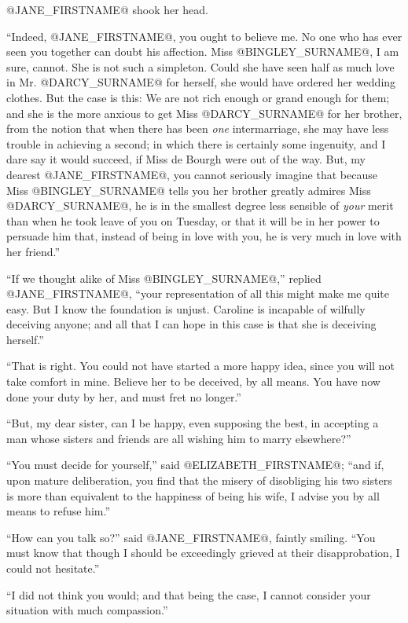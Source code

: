 @JANE_FIRSTNAME@ shook her head.

``Indeed, @JANE_FIRSTNAME@, you ought to believe me. No one who has ever seen you
together can doubt his affection. Miss @BINGLEY_SURNAME@, I am sure, cannot. She
is not such a simpleton. Could she have seen half as much love in Mr.
@DARCY_SURNAME@ for herself, she would have ordered her wedding clothes. But the
case is this: We are not rich enough or grand enough for them; and she
is the more anxious to get Miss @DARCY_SURNAME@ for her brother, from the notion
that when there has been \textit{one} intermarriage, she may have less trouble
in achieving a second; in which there is certainly some ingenuity, and
I dare say it would succeed, if Miss de Bourgh were out of the way. But,
my dearest @JANE_FIRSTNAME@, you cannot seriously imagine that because Miss @BINGLEY_SURNAME@
tells you her brother greatly admires Miss @DARCY_SURNAME@, he is in the smallest
degree less sensible of \textit{your} merit than when he took leave of you on
Tuesday, or that it will be in her power to persuade him that, instead
of being in love with you, he is very much in love with her friend.''

``If we thought alike of Miss @BINGLEY_SURNAME@,'' replied @JANE_FIRSTNAME@, ``your
representation of all this might make me quite easy. But I know the
foundation is unjust. Caroline is incapable of wilfully deceiving
anyone; and all that I can hope in this case is that she is deceiving
herself.''

``That is right. You could not have started a more happy idea, since you
will not take comfort in mine. Believe her to be deceived, by all means.
You have now done your duty by her, and must fret no longer.''

``But, my dear sister, can I be happy, even supposing the best, in
accepting a man whose sisters and friends are all wishing him to marry
elsewhere?''

``You must decide for yourself,'' said @ELIZABETH_FIRSTNAME@; ``and if, upon mature
deliberation, you find that the misery of disobliging his two sisters is
more than equivalent to the happiness of being his wife, I advise you by
all means to refuse him.''

``How can you talk so?'' said @JANE_FIRSTNAME@, faintly smiling. ``You must know that
though I should be exceedingly grieved at their disapprobation, I could
not hesitate.''

``I did not think you would; and that being the case, I cannot consider
your situation with much compassion.''

